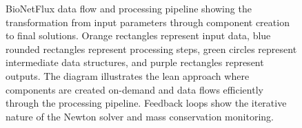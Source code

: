 \begin{figure}[htbp]
\begin{tikzpicture}
\end{tikzpicture}
\caption[BioNetFlux Data Flow]{
BioNetFlux data flow and processing pipeline showing the transformation from input parameters through component creation to final solutions. 
Orange rectangles represent input data, blue rounded rectangles represent processing steps, 
green circles represent intermediate data structures, and purple rectangles represent outputs. 
The diagram illustrates the lean approach where components are created on-demand and data flows efficiently through the processing pipeline.
Feedback loops show the iterative nature of the Newton solver and mass conservation monitoring.
}
\label{fig:bionetflux_dataflow}
\end{figure}
